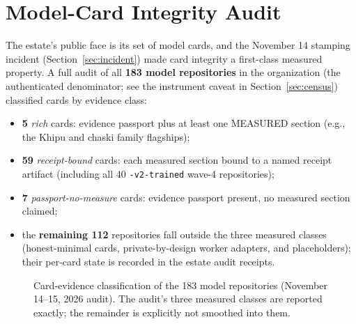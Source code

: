 
\section{Model-Card Integrity Audit}
\label{sec:cards}

The estate's public face is its set of model cards, and the November 14 stamping incident (Section~\ref{sec:incident}) made card integrity a first-class measured property. A full audit of all \textbf{183 model repositories} in the organization (the authenticated denominator; see the instrument caveat in Section~\ref{sec:census}) classified cards by evidence class:
\begin{itemize}
\item \textbf{5} \emph{rich} cards: evidence passport plus at least one MEASURED section (e.g., the Khipu and chaski family flagships);
\item \textbf{59} \emph{receipt-bound} cards: each measured section bound to a named receipt artifact (including all 40 \texttt{-v2-trained} wave-4 repositories);
\item \textbf{7} \emph{passport-no-measure} cards: evidence passport present, no measured section claimed;
\item the \textbf{remaining 112} repositories fall outside the three measured classes (honest-minimal cards, private-by-design worker adapters, and placeholders); their per-card state is recorded in the estate audit receipts.
\end{itemize}

\begin{figure}[htbp]
\centering
{}
\caption{Card-evidence classification of the 183 model repositories (November 14--15, 2026 audit). The audit's three measured classes are reported exactly; the remainder is explicitly not smoothed into them.}
\label{fig:cards}
\end{figure}

